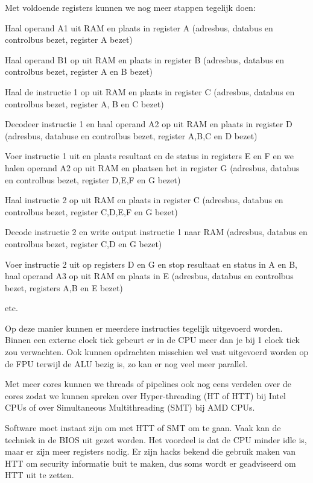 Met voldoende registers kunnen we nog meer stappen tegelijk doen:
\begin{description}
\item [Clock tick 1 opgaande flank] Haal operand A1 uit RAM en plaats in register A (adresbus, databus en controlbus bezet, register A bezet)
\item [Clock tick 1 neergaande flank] Haal operand B1 op uit RAM en plaats in register B (adresbus, databus en controlbus bezet, register A en B bezet)
\item [Clock tick 2 opgaande flank] Haal de instructie 1 op uit RAM en plaats in register C (adresbus, databus en controlbus bezet, register A, B en C bezet)
\item [Clock tick 2 neergaande flank] Decodeer instructie 1 en haal operand A2 op uit RAM en plaats in register D (adresbus, databuse en controlbus bezet, register A,B,C en D bezet)
\item [clock tick 3 opgaande flank] Voer instructie 1 uit en plaats resultaat en de status in registers E en F en we halen operand A2 op uit RAM en plaatsen het in register G (adresbus, databus en controlbus bezet, register D,E,F en G bezet)
\item [clock tick 3 neergaande flank] Haal instructie 2 op uit RAM en plaats in register C (adresbus, databus en controlbus bezet, register C,D,E,F en G bezet)
\item [clock tick 4 opgaande flank] Decode instructie 2 en write output instructie 1 naar RAM (adresbus, databus en controlbus bezet, register C,D en G bezet)
\item [Clock tick 4 neergaande flank] Voer instructie 2 uit op registers D en G en stop resultaat en status in A en B, haal operand A3 op uit RAM en plaats in E (adresbus, databus en controlbus bezet, registers A,B en E bezet)
\item etc.
\end{description}
Op deze manier kunnen er meerdere instructies tegelijk uitgevoerd worden. Binnen een externe clock tick gebeurt er in de CPU meer dan je bij 1 clock tick zou verwachten. Ook kunnen opdrachten misschien wel vast uitgevoerd worden op de FPU terwijl de ALU bezig is, zo kan er nog veel meer parallel.

Met meer cores kunnen we threads of pipelines ook nog eens verdelen over de cores zodat we kunnen spreken over Hyper-threading (HT of HTT) bij Intel CPUs of over Simultaneous Multithreading (SMT) bij AMD CPUs.

Software moet instaat zijn om met HTT of SMT om te gaan. Vaak kan de techniek in de BIOS uit gezet worden. Het voordeel is dat de CPU minder idle is, maar er zijn meer registers nodig. Er zijn hacks bekend die gebruik maken van HTT om security informatie buit te maken, dus soms wordt er geadviseerd om HTT uit te zetten.

